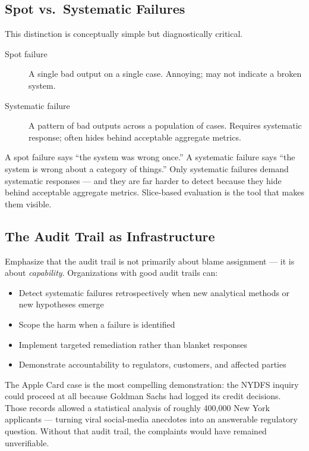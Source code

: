 \subsection{Spot vs.\ Systematic Failures}

This distinction is conceptually simple but diagnostically critical.

\begin{description}
    \item[Spot failure] A single bad output on a single case. Annoying; may not indicate a broken system.
    \item[Systematic failure] A pattern of bad outputs across a population of cases. Requires systematic response; often hides behind acceptable aggregate metrics.
\end{description}

\begin{technote}
A spot failure says ``the system was wrong once.'' A systematic failure says ``the system is wrong about a category of things.'' Only systematic failures demand systematic responses --- and they are far harder to detect because they hide behind acceptable aggregate metrics. Slice-based evaluation is the tool that makes them visible.
\end{technote}

\subsection{The Audit Trail as Infrastructure}

Emphasize that the audit trail is not primarily about blame assignment --- it is about \emph{capability}. Organizations with good audit trails can:
\begin{itemize}
    \item Detect systematic failures retrospectively when new analytical methods or new hypotheses emerge
    \item Scope the harm when a failure is identified
    \item Implement targeted remediation rather than blanket responses
    \item Demonstrate accountability to regulators, customers, and affected parties
\end{itemize}

The Apple Card case is the most compelling demonstration: the NYDFS inquiry could proceed at all because Goldman Sachs had logged its credit decisions. Those records allowed a statistical analysis of roughly 400,000 New York applicants --- turning viral social-media anecdotes into an answerable regulatory question. Without that audit trail, the complaints would have remained unverifiable.

